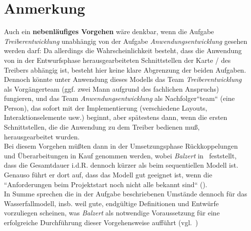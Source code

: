 \section*{Anmerkung}
Auch ein \textbf{nebenläufiges Vorgehen}  wäre denkbar, wenn die Aufgabe \textit{Treiberentwicklung} unabhängig von der Aufgabe \textit{Anwendungsentwicklung} gesehen werden darf: Da allerdings die Wahrscheinlichkeit besteht, dass die Anwendung von in der Entwurfsphase herausgearbeiteten Schnittstellen der Karte / des Treibers abhängig ist, besteht hier keine klare Abgrenzung der beiden Aufgaben.\\
Dennoch könnte unter Anwendung dieses Modells das Team \textit{Treiberentwicklung} als Vorgängerteam (ggf. zwei Mann aufgrund des fachlichen Anspruchs) fungieren, und das Team \textit{Anwendungsentwicklung} als Nachfolger``team`` (eine Person), das sofort mit der Implementierung (verschiedene Layouts, Interaktionselemente usw.) beginnt, aber spätestens dann,  wenn die ersten Schnittstellen, die die Anwendung zu dem Treiber bedienen muß, herausgearbeitet wurden.\\
Bei diesem Vorgehen müßten dann in der Umsetzungsphase Rückkoppelungen und Überarbeitungen in Kauf genommen werden, wobei
\textit{Balzert} in~\cite[522]{Bal08} feststellt, dass die Gesamtdauer i.d.R. dennoch kürzer als beim sequentiellen Modell ist.
Genauso führt er dort auf, dass das Modell gut geeignet ist, wenn die ``Anforderungen beim Projektstart noch nicht alle bekannt sind`` (\cite[524]{Bal08}). \\
In Summe sprechen die in der Aufgabe beschriebenen Umstände dennoch für das Wasserfallmodell, insb. weil gute, endgültige Definitionen und Entwürfe vorzuliegen scheinen, was \textit{Balzert} als notwendige Voraussetzung für eine erfolgreiche Durchführung dieser Vorgehensweise aufführt (vgl.~\cite[519]{Bal08})
